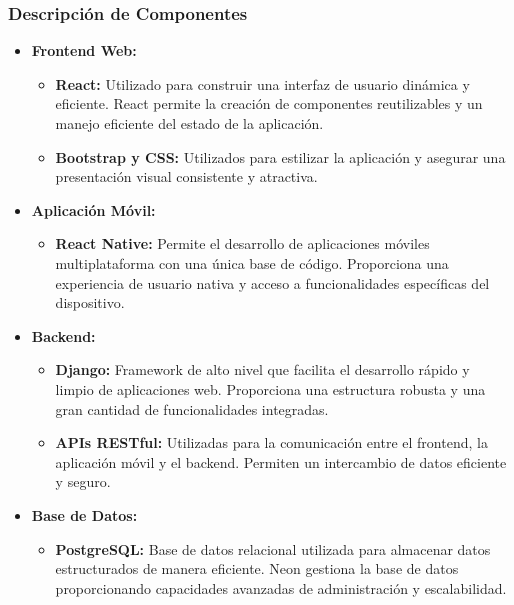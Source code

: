 \subsubsection{Descripción de Componentes}

\begin{itemize}
    \item \textbf{Frontend Web:} 
    \begin{itemize}
        \item \textbf{React:} Utilizado para construir una interfaz de usuario dinámica y eficiente. React permite la creación de componentes reutilizables y un manejo eficiente del estado de la aplicación.
        \item \textbf{Bootstrap y CSS:} Utilizados para estilizar la aplicación y asegurar una presentación visual consistente y atractiva.
    \end{itemize}
    
    \item \textbf{Aplicación Móvil:} 
    \begin{itemize}
        \item \textbf{React Native:} Permite el desarrollo de aplicaciones móviles multiplataforma con una única base de código. Proporciona una experiencia de usuario nativa y acceso a funcionalidades específicas del dispositivo.
    \end{itemize}
    
    \item \textbf{Backend:} 
    \begin{itemize}
        \item \textbf{Django:} Framework de alto nivel que facilita el desarrollo rápido y limpio de aplicaciones web. Proporciona una estructura robusta y una gran cantidad de funcionalidades integradas.
        \item \textbf{APIs RESTful:} Utilizadas para la comunicación entre el frontend, la aplicación móvil y el backend. Permiten un intercambio de datos eficiente y seguro.
    \end{itemize}
    
    \item \textbf{Base de Datos:} 
    \begin{itemize}
        \item \textbf{PostgreSQL:} Base de datos relacional utilizada para almacenar datos estructurados de manera eficiente. Neon gestiona la base de datos proporcionando capacidades avanzadas de administración y escalabilidad.
    \end{itemize}
    
\end{itemize}

